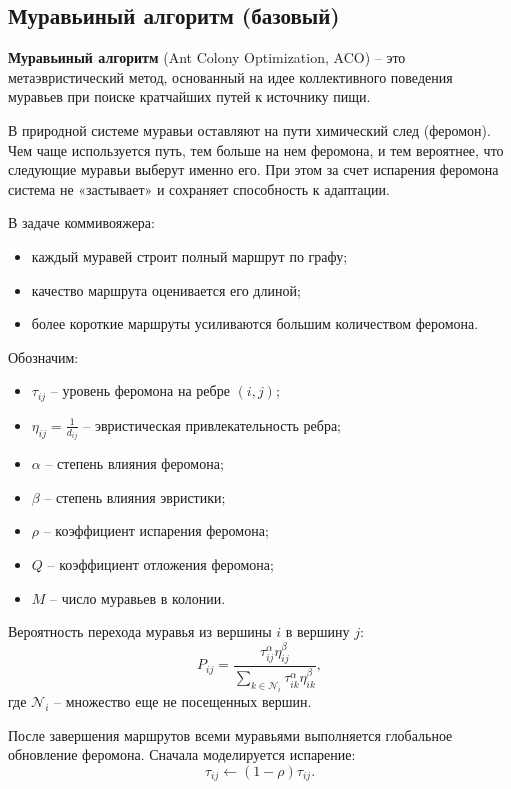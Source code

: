 \documentclass[12pt,a4paper]{article}
\begin{document}
\subsection{Муравьиный алгоритм (базовый)}

\textbf{Муравьиный алгоритм} (Ant Colony Optimization, ACO) -- это метаэвристический
метод, основанный на идее коллективного поведения муравьев при поиске кратчайших
путей к источнику пищи.

В природной системе муравьи оставляют на пути химический след (феромон). Чем чаще
используется путь, тем больше на нем феромона, и тем вероятнее, что следующие муравьи
выберут именно его. При этом за счет испарения феромона система не «застывает» и
сохраняет способность к адаптации.

В задаче коммивояжера:
\begin{itemize}
    \item каждый муравей строит полный маршрут по графу;
    \item качество маршрута оценивается его длиной;
    \item более короткие маршруты усиливаются большим количеством феромона.
\end{itemize}

Обозначим:
\begin{itemize}
    \item $\tau_{ij}$ -- уровень феромона на ребре $(i,j)$;
    \item $\eta_{ij}=\frac{1}{d_{ij}}$ -- эвристическая привлекательность ребра;
    \item $\alpha$ -- степень влияния феромона;
    \item $\beta$ -- степень влияния эвристики;
    \item $\rho$ -- коэффициент испарения феромона;
    \item $Q$ -- коэффициент отложения феромона;
    \item $M$ -- число муравьев в колонии.
\end{itemize}

Вероятность перехода муравья из вершины $i$ в вершину $j$:
\begin{equation}
P_{ij}=
\frac{\tau_{ij}^{\alpha}\eta_{ij}^{\beta}}
{\sum\limits_{k \in \mathcal{N}_i} \tau_{ik}^{\alpha}\eta_{ik}^{\beta}},
\end{equation}
где $\mathcal{N}_i$ -- множество еще не посещенных вершин.

После завершения маршрутов всеми муравьями выполняется глобальное обновление феромона.
Сначала моделируется испарение:
\begin{equation}
\tau_{ij} \leftarrow (1-\rho)\tau_{ij}.
\end{equation}
\end{document}
